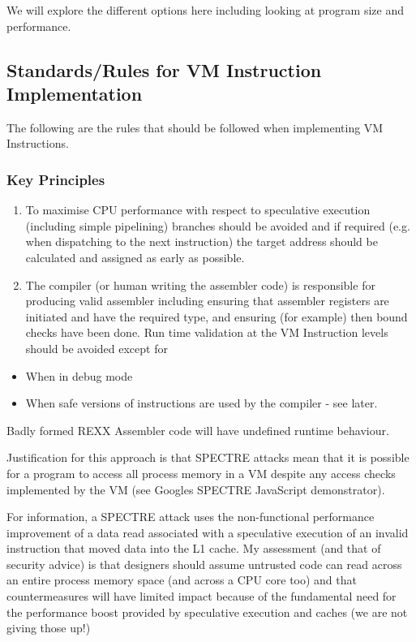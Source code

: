 We will explore the different options here including looking at program size
and performance.

\subsection{Standards/Rules for VM Instruction Implementation}

The following are the rules that should be followed when implementing VM Instructions.

\subsubsection{Key Principles}

\begin{enumerate}
\item To maximise CPU performance with respect to speculative execution (including simple pipelining) branches should be avoided and if required (e.g. when dispatching to the next instruction) the target address should be calculated and assigned as early as possible.

\item The compiler (or human writing the assembler code) is responsible for producing valid assembler including ensuring that assembler registers are initiated and have the required type, and ensuring (for example) then bound checks have been done. Run time validation at the VM Instruction levels should be avoided except for

\end{enumerate}

\begin{itemize}
\item When in debug mode

\item When \textquotedbl{}safe\textquotedbl{} versions of instructions are used by the compiler - see later.

\end{itemize}

Badly formed REXX Assembler code will have undefined runtime behaviour.

Justification for this approach is that SPECTRE attacks mean that it is possible for a program to access all process memory in a VM despite any access checks implemented by the VM (see Google\textquotesingle{}s SPECTRE JavaScript demonstrator).

For information, a SPECTRE attack uses the non-functional performance improvement of a data read associated with a speculative execution of an invalid instruction that moved data into the L1 cache. My assessment (and that of security advice) is that designers should assume untrusted code can read across an entire process memory space (and across a CPU core too) and that countermeasures will have limited impact because of the fundamental need for the performance boost provided by speculative execution and caches (we are not giving those up!)


